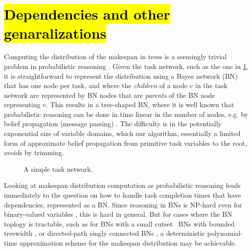 \documentclass{article}
\begin{document}
\section{\hl{Dependencies and other genaralizations}}\label{sec:generalizations}

Computing the distribution of the makespan in trees is a seemingly trivial problem 
in probabilistic reasoning \cite{Pearl}.
Given the task network, such as the one in \ref{fig:task-network},
it is straightforward to represent the 
distribution using a Bayes network (BN) that has one node
per task, and where the {\em children} of a node $v$ in the 
task network are represented by BN nodes that are {\em parents} of
the BN node representing $v$. This results in a tree-shaped BN, 
where it is well known that probabilistic reasoning can be done in time linear
in the number of nodes, e.g. by belief propagation (message passing) \cite{Pearl,Kim}. 
The difficulty is in the potentially exponential size
of variable domains, which our algorithm, essentially a limited form
of approximate belief propagation from primitive task variables to the root, avoids by trimming.

\begin{figure}
\centering
{}
\caption{A simple task network.}
\label{fig:task-network}
\end{figure}

Looking at makespan distribution computation as probabilistic reasoning leads immediately to 
the question on how to handle task completion times that have dependencies, represented as a BN. 
Since reasoning in BNs is NP-hard even for binary-valued variables \cite{Dagum.aij,Cooper.ai}, 
this is hard in general.
But for cases where the BN toplogy is tractable, such as for BNs with a small 
cutset~\cite{??}
BNs with bounded treewidth \cite{Bodlaender:2006:TCA:2092758.2092759},
or directed-path singly connected BNs \cite{ShimonyDomshlak.aiRN2003},
a deterministic polynomial-time approximation scheme for 
the makespan distribution may be achievable.
\end{document}

